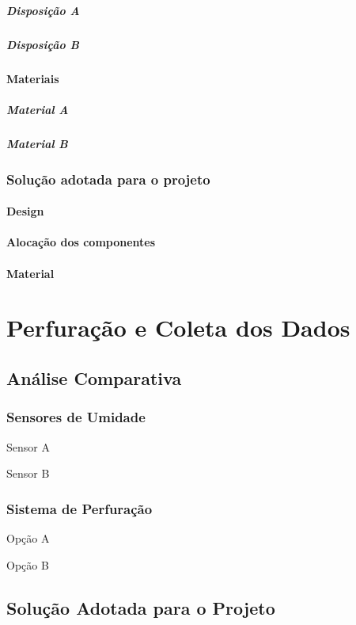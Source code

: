 \subparagraph{Disposição A}

\subparagraph{Disposição B}

\paragraph{Materiais}

\subparagraph{Material A}

\subparagraph{Material B}

\subsubsection{Solução adotada para o projeto}

\paragraph{Design}

\paragraph{Alocação dos componentes}

\paragraph{Material}

\section{Perfuração e Coleta dos Dados}

\subsection{Análise Comparativa}

\subsubsection{Sensores de Umidade}

Sensor A

Sensor B

\subsubsection{Sistema de Perfuração}

Opção A

Opção B

\subsection{Solução Adotada para o Projeto}

